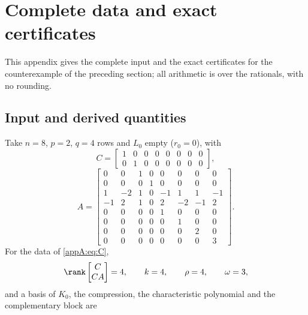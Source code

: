 ﻿\section{Complete data and exact certificates}
\label{appA}\label{app:data}
This appendix gives the complete input and the exact certificates for the counterexample of the
preceding section; all arithmetic is over the rationals, with no rounding.
\subsection{Input and derived quantities}
\label{appA:input}\label{appA:derived}
Take $n=8$, $p=2$, $q=4$ rows and $L_0$ empty ($r_0=0$), with
\begin{equation}
\label{appA:eq:C}
C=\begin{bmatrix}1&0&0&0&0&0&0&0\\0&1&0&0&0&0&0&0\end{bmatrix},
\end{equation}
\begin{equation}
\label{appA:eq:A}
A=\begin{bmatrix}
0&0&1&0&0&0&0&0\\0&0&0&1&0&0&0&0\\
1&-2&1&0&-1&1&1&-1\\-1&2&1&0&2&-2&-1&2\\
0&0&0&0&1&0&0&0\\0&0&0&0&0&1&0&0\\
0&0&0&0&0&0&2&0\\0&0&0&0&0&0&0&3
\end{bmatrix}.
\end{equation}
For the data of \eqref{appA:eq:C},
\begin{equation}\label{appA:eq:rank}
\rank\begin{bmatrix}C\\ CA\end{bmatrix}=4,\qquad k=4,\qquad \rho=4,\qquad \omega=3,
\end{equation}
and a basis of $K_0$, the compression, the characteristic polynomial and the complementary block are
